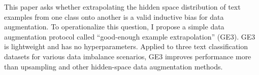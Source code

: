 This paper asks whether extrapolating the hidden space distribution of text examples from one class onto another is a valid inductive bias for data augmentation. To operationalize this question, I propose a simple data augmentation protocol called ``good-enough example extrapolation'' (GE3). GE3 is lightweight and has no hyperparameters. Applied to three text classification datasets for various data imbalance scenarios, GE3 improves performance more than upsampling and other hidden-space data augmentation methods.

